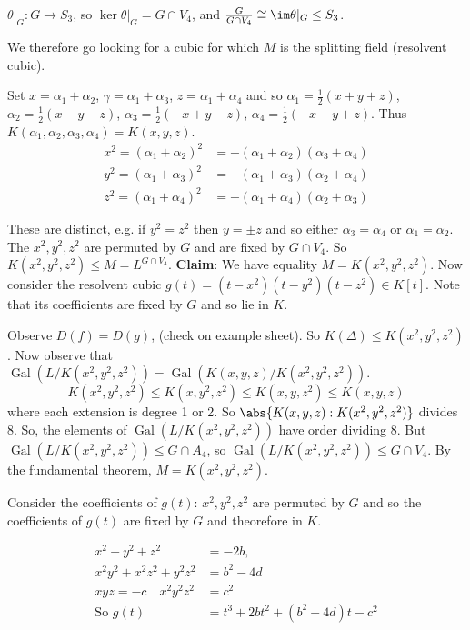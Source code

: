 \documentclass{article}
\DeclareMathOperator{\Gal}{Gal}
\begin{document}
$\theta|_G : G \to S_3$, so $\ker \theta|_G = G \cap V_4$, and $\frac{G}{G \cap V_4} \cong \im \theta|_G \leq S_3$.

We therefore go looking for a cubic for which $M$ is the splitting field (resolvent cubic).

Set $x= \alpha_1 + \alpha_2$, $\gamma = \alpha_1 + \alpha_3$, $z = \alpha_1 + \alpha_4$ and so $\alpha_1 = \frac{1}{2}(x+y+z)$, $\alpha_2=\frac{1}{2}(x - y - z)$, $\alpha_3=\frac{1}{2}(-x+y-z)$, $\alpha_4=\frac{1}{2}(-x-y+z)$.
Thus $K(\alpha_1, \alpha_2, \alpha_3, \alpha_4)=K(x,y,z)$.
\begin{align*}
    x^2=(\alpha_1+\alpha_2)^2&=-(\alpha_1+\alpha_2)(\alpha_3+\alpha_4)\\
    y^2=(\alpha_1+\alpha_3)^2&=-(\alpha_1+\alpha_3)(\alpha_2+\alpha_4)\\
    z^2=(\alpha_1+\alpha_4)^2&=-(\alpha_1+\alpha_4)(\alpha_2+\alpha_3)
\end{align*}

These are distinct, e.g. if $y^2=z^2$ then $y=\pm z$ and so either $\alpha_3 = \alpha_4$ or $\alpha_1 = \alpha_2$.
The $x^2,y^2,z^2$ are permuted by $G$ and are fixed by $G \cap V_4$. So $K(x^2, y^2, z^2) \leq M = L^{G \cap V_4}$.
\textbf{Claim}: We have equality $M=K(x^2, y^2, z^2)$. Now consider the resolvent cubic $g(t) = (t-x^2)(t-y^2)(t-z^2) \in K[t]$.
Note that its coefficients are fixed by $G$ and so lie in $K$.

Observe $D(f) = D(g)$, (check on example sheet).
So $K(\Delta) \leq K(x^2, y^2, z^2)$. Now observe that $\Gal(L/K(x^2, y^2, z^2)) = \Gal(K(x,y,z)/K(x^2,y^2,z^2))$.
\begin{equation*}
    K(x^2,y^2,z^2) \leq K(x,y^2,z^2)\leq K(x,y,z^2) \leq K(x,y,z)
\end{equation*}
where each extension is degree 1 or 2.
So $\abs{K(x,y,z):K(x^2,y^2,z^2)}$ divides 8.
So, the elements of $\Gal(L/K(x^2,y^2,z^2))$ have order dividing 8.
But $\Gal(L/K(x^2,y^2,z^2)) \leq G \cap A_4$, so $\Gal(L/K(x^2,y^2,z^2)) \leq G \cap V_4$.
By the fundamental theorem, $M=K(x^2,y^2,z^2)$.

Consider the coefficients of $g(t)$: $x^2,y^2,z^2$ are permuted by $G$ and so the coefficients of $g(t)$ are fixed by $G$ and theorefore in $K$.

\begin{align*}
    x^2+y^2+z^2&=-2b,\\
    x^2y^2+x^2z^2+y^2z^2&=b^2-4d\\
    xyz=-c \quad x^2y^2z^2&=c^2\\
    \text{So } g(t)&=t^3+2bt^2+(b^2-4d)t-c^2
\end{align*}
\end{document}
